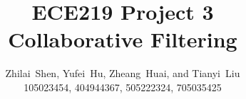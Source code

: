 \documentclass{article}
\begin{document}
%
\title{ECE219 Project 3\\ Collaborative Filtering}
%
%
\author{Zhilai~Shen, Yufei~Hu, Zheang~Huai, and Tianyi~Liu \\
105023454, 404944367, 505222324, 705035425
}
%

%
%
%
%

\end{document}
